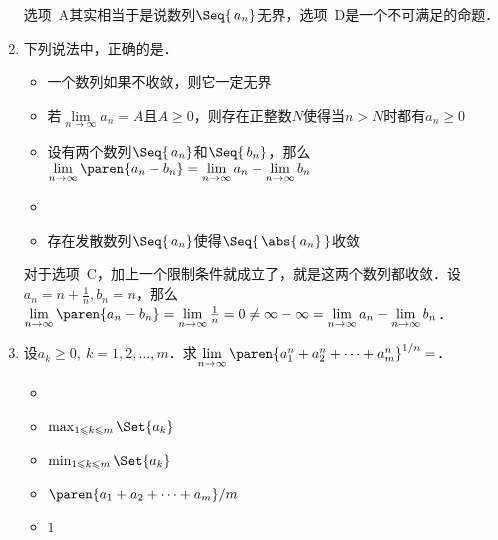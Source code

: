 \begin{enumerate}
  \ifshowsol
    选项~A其实相当于是说数列\(\Seq{\,a_n}\)无界，选项~D是一个不可满足的命题．
  \fi

\item 下列说法中，正确的是\uline{\makebox[10em]{}}．
  \begin{itemize}
    \renewcommand{\labelitemi}{\faCircleThin}
  \item 一个数列如果不收敛，则它一定无界
  \item 若\(\lim\limits_{n\to\infty} a_n = A\)且\(A \ge 0\)，则存在正整数\(N\)使得当\(n > N\)时都有\(a_n \ge 0\)
  \item 设有两个数列\(\Seq{\,a_n}\)和\(\Seq{\,b_n}\)，那么\(\lim\limits_{n\to\infty} \paren{a_n - b_n} = \lim\limits_{n\to\infty} a_n - \lim\limits_{n\to\infty} b_n\)
    \ifshowsol
    \item[\faCircle]
    \else
    \item
    \fi
    存在发散数列\(\Seq{\,a_n}\)使得\(\Seq{\,\abs{\,a_n}\,}\)收敛
  \end{itemize}

  \ifshowsol
    对于选项~C，加上一个限制条件就成立了，就是这两个数列都收敛．设\(a_n = n + \frac1n, b_n = n\)，那么\(\lim\limits_{n\to\infty} \paren{a_n - b_n} = \lim\limits_{n\to\infty} \frac1n = 0 \ne \infty - \infty = \lim\limits_{n\to\infty} a_n - \lim\limits_{n\to\infty} b_n\)．
  \fi

\item 设\(a_k \ge 0,\ k = 1, 2, \dots, m\)．求\(\lim\limits_{n\to\infty} \paren{a_1^n + a_2^n + \dots + a_m^n}^{1/n} =\)\uline{\makebox[6em]{}}．
  \begin{itemize}
    \renewcommand{\labelitemi}{\faCircleThin}
    \ifshowsol
    \item[\faCircle]
    \else
    \item
    \fi
    \(\max_{1 \le k \le m} \Set{a_k}\)
  \item \(\min_{1 \le k \le m} \Set{a_k}\)
  \item \(\paren{a_1 + a_2 + \dots + a_m}/{m}\) %
  \item \(1\)
  \end{itemize}


\end{enumerate}
